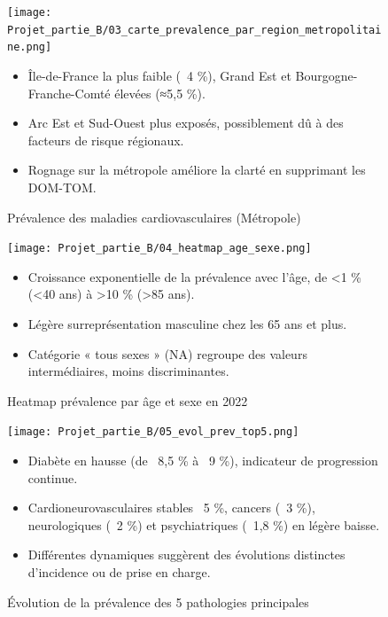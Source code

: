 \documentclass[12pt,a4paper]{article}
\begin{document}
\begin{figure}[H]
  \centering
  \begin{minipage}[t]{0.7\textwidth}
    \centering
    \texttt{[image: Projet\_partie\_B/03\_carte\_prevalence\_par\_region\_metropolitaine.png]}
    \caption{Prévalence des maladies cardiovasculaires (Métropole)}
    \label{fig:carte_prevalence}
  \end{minipage}
    \begin{itemize}
      \item Île-de-France la plus faible (~4 \%), Grand Est et Bourgogne-Franche-Comté élevées (≈5,5 \%).  
      \item Arc Est et Sud-Ouest plus exposés, possiblement dû à des facteurs de risque régionaux.  
      \item Rognage sur la métropole améliore la clarté en supprimant les DOM-TOM.  
    \end{itemize}
\end{figure}

\begin{figure}[H]
  \centering
  \begin{minipage}[t]{1\textwidth}
    \centering
    \texttt{[image: Projet\_partie\_B/04\_heatmap\_age\_sexe.png]}
    \caption{Heatmap prévalence par âge et sexe en 2022}
    \label{fig:heatmap_age_sexe}
  \end{minipage}
    \begin{itemize}
      \item Croissance exponentielle de la prévalence avec l’âge, de <1 \% (<40 ans) à >10 \% (>85 ans).  
      \item Légère surreprésentation masculine chez les 65 ans et plus.  
      \item Catégorie « tous sexes » (NA) regroupe des valeurs intermédiaires, moins discriminantes.  
    \end{itemize}
\end{figure}

\begin{figure}[H]
  \centering
  \begin{minipage}[t]{0.8\textwidth}
    \centering
    \texttt{[image: Projet\_partie\_B/05\_evol\_prev\_top5.png]}
    \caption{Évolution de la prévalence des 5 pathologies principales}
    \label{fig:evol_prev_top5}
  \end{minipage}
  \hfill
    \begin{itemize}
      \item Diabète en hausse (de ~8,5 \% à ~9 \%), indicateur de progression continue.  
      \item Cardioneurovasculaires stables ~5 \%, cancers (~3 \%), neurologiques (~2 \%) et psychiatriques (~1,8 \%) en légère baisse.  
      \item Différentes dynamiques suggèrent des évolutions distinctes d’incidence ou de prise en charge.  
    \end{itemize}
\end{figure}
\end{document}
